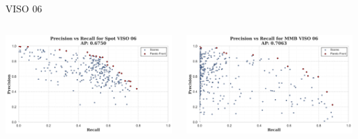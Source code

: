 \begin{frame}{VISO 06}
    \begin{columns}
        \begin{column}{0.5\textwidth}
            \centering
            \includegraphics[width=\textwidth,keepaspectratio]{images/bom/precision_recall_Spot_VISO_06.png}
        \end{column}
        \begin{column}{0.5\textwidth}
            \centering
            \includegraphics[width=\textwidth,keepaspectratio]{images/bom/precision_recall_MMB_VISO_06.png}
        \end{column}
    \end{columns}
\end{frame}


